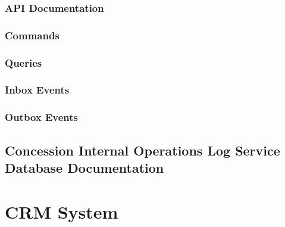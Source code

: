 \documentclass[letterpaper,10pt,english]{sphinxmanual}
\begin{document}


\subsection{API Documentation}
\label{\detokenize{administration_concession_system/internal_operations_log_service:api-documentation}}

\subsection{Commands}
\label{\detokenize{administration_concession_system/internal_operations_log_service:commands}}

\subsection{Queries}
\label{\detokenize{administration_concession_system/internal_operations_log_service:queries}}

\subsection{Inbox Events}
\label{\detokenize{administration_concession_system/internal_operations_log_service:inbox-events}}

\subsection{Outbox Events}
\label{\detokenize{administration_concession_system/internal_operations_log_service:outbox-events}}

\section{Concession Internal Operations Log Service Database Documentation}
\label{\detokenize{administration_concession_system/internal_operations_log_service:concession-internal-operations-log-service-database-documentation}}
\sphinxstepscope


\chapter{CRM System}
\label{\detokenize{crm_system/index:crm-system}}\label{\detokenize{crm_system/index::doc}}
\sphinxstepscope
\end{document}
